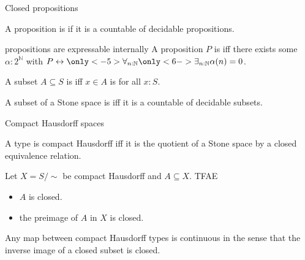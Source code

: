 \documentclass{beamer}
\begin{document}
\begin{frame}{Closed propositions}
\begin{definition}
  A proposition is  if it is a countable 
   of decidable propositions. 
\end{definition}
\pause 
\begin{block}{
   
  propositions are expressable internally}
  A proposition $P$ is 
  iff \pause there exists some $\alpha:2^\mathbb N$ with 
  $P\leftrightarrow \only<-5>{\forall_{n:\mathbb N}}\only<6->{\exists_{n:\mathbb N}}\alpha(n) = 0$.
\end{block}
\pause
\begin{definition}
  A subset $A\subseteq S$ is 
  \only<-5>{closed} \only<6->{open}
  iff $x\in A$ is 
  for all $x:S$. 
\end{definition}
\pause
\begin{lemma}
  A subset of a Stone space is 
   
  iff 
  it is a countable  of decidable subsets.
\end{lemma}
\end{frame}

\begin{frame}{Compact Hausdorff spaces}
  \begin{definition}
    A type is compact Hausdorff iff it is the quotient of a 
    Stone space by a closed equivalence relation. 
  \end{definition}
  \pause
  \begin{lemma}
    Let $X = S / \sim $ be compact Hausdorff and $A\subseteq X$. TFAE
    \begin{itemize}
      \item $A$ is closed. 
      \item the preimage of $A$ in $X$ is closed. 
    \end{itemize}
\end{lemma}
\pause
  \begin{corollary}
    Any map between compact Hausdorff types is 
    continuous in the sense that the 
    inverse image of a closed subset is closed. 
  \end{corollary}
\end{frame} 
\end{document}
